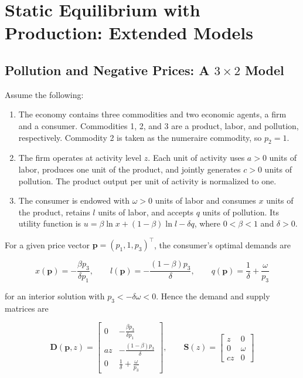 \documentclass[
  letterpaper,
  DIV=11,
  numbers=noendperiod]{scrreprt}
\begin{document}

\chapter{Static Equilibrium with Production: Extended
Models}\label{static-equilibrium-with-production-extended-models}

\section{\texorpdfstring{Pollution and Negative Prices: A \(3\times2\)
Model}{Pollution and Negative Prices: A 3\textbackslash times2 Model}}\label{pollution-and-negative-prices-a-3times2-model}

Assume the following:

\begin{enumerate}
\def\labelenumi{\arabic{enumi}.}
\item
  The economy contains three commodities and two economic agents, a firm
  and a consumer. Commodities 1, 2, and 3 are a product, labor, and
  pollution, respectively. Commodity 2 is taken as the numeraire
  commodity, so \(p_2=1\).
\item
  The firm operates at activity level \(z\). Each unit of activity uses
  \(a>0\) units of labor, produces one unit of the product, and jointly
  generates \(c>0\) units of pollution. The product output per unit of
  activity is normalized to one.
\item
  The consumer is endowed with \(\omega>0\) units of labor and consumes
  \(x\) units of the product, retains \(l\) units of labor, and accepts
  \(q\) units of pollution. Its utility function is
  \(u=\beta\ln x+(1-\beta)\ln l-\delta q\), where \(0<\beta<1\) and
  \(\delta>0\).
\end{enumerate}

For a given price vector \(\mathbf p=(p_1,1,p_3)^\top\), the consumer's
optimal demands are

\[
x(\mathbf p)=-\frac{\beta p_3}{\delta p_1},\qquad
l(\mathbf p)=-\frac{(1-\beta)p_3}{\delta},\qquad
q(\mathbf p)=\frac{1}{\delta}+\frac{\omega}{p_3}
\]

for an interior solution with \(p_3<-\delta\omega<0\). Hence the demand
and supply matrices are

\[
\mathbf D(\mathbf p,z)=
\begin{bmatrix}
0&-\frac{\beta p_3}{\delta p_1}\\
az&-\frac{(1-\beta)p_3}{\delta}\\
0&\frac{1}{\delta}+\frac{\omega}{p_3}
\end{bmatrix},
\qquad
\mathbf S(z)=
\begin{bmatrix}
z&0\\
0&\omega\\
cz&0
\end{bmatrix}
\]
\end{document}
